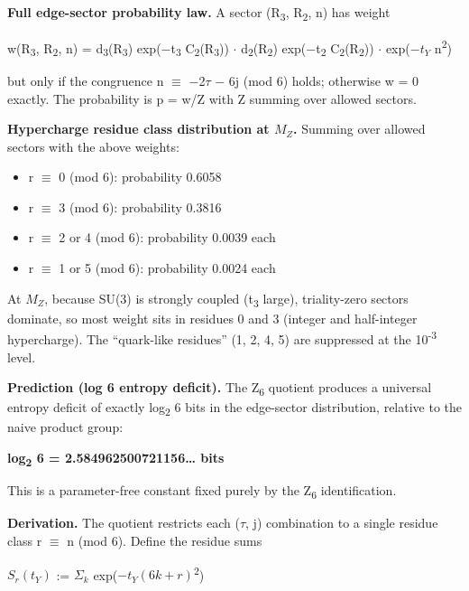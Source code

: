\documentclass[11pt,a4paper]{article}
\theoremstyle{remark}
\providecommand{\tightlist}{%
  \setlength{\itemsep}{0pt}\setlength{\parskip}{0pt}}
\begin{document}
\textbf{Full edge-sector probability law.} A sector (R\textsubscript{3}, R\textsubscript{2}, n) has weight

w(R\textsubscript{3}, R\textsubscript{2}, n) = d\textsubscript{3}(R\textsubscript{3}) exp(\ensuremath{-}t\textsubscript{3} C\textsubscript{2}(R\textsubscript{3})) \ensuremath{\cdot} d\textsubscript{2}(R\textsubscript{2}) exp(\ensuremath{-}t\textsubscript{2} C\textsubscript{2}(R\textsubscript{2})) \ensuremath{\cdot} exp(\ensuremath{-}\(t_Y\) n\textsuperscript{2})

but only if the congruence n \ensuremath{\equiv} \ensuremath{-}2\ensuremath{\tau} \ensuremath{-} 6j (mod 6) holds; otherwise w = 0 exactly. The probability is p = w/Z with Z summing over allowed sectors.

\textbf{Hypercharge residue class distribution at \(M_Z\).} Summing over allowed
sectors with the above weights:

\begin{itemize}
\tightlist
\item
  r \ensuremath{\equiv} 0 (mod 6): probability 0.6058
\item
  r \ensuremath{\equiv} 3 (mod 6): probability 0.3816
\item
  r \ensuremath{\equiv} 2 or 4 (mod 6): probability 0.0039 each
\item
  r \ensuremath{\equiv} 1 or 5 (mod 6): probability 0.0024 each
\end{itemize}

At \(M_Z\), because SU(3) is strongly coupled (t\textsubscript{3} large), triality-zero
sectors dominate, so most weight sits in residues 0 and 3 (integer and
half-integer hypercharge). The ``quark-like residues'' (1, 2, 4, 5) are
suppressed at the 10\textsuperscript{-3} level.

\textbf{Prediction (log 6 entropy deficit).} The Z\textsubscript{6} quotient produces a universal entropy deficit of exactly log\textsubscript{2} 6 bits in the edge-sector distribution, relative to the naive product group:

\textbf{log\textsubscript{2} 6 = 2.584962500721156\ldots{} bits}

This is a parameter-free constant fixed purely by the Z\textsubscript{6} identification.

\textbf{Derivation.} The quotient restricts each (\ensuremath{\tau}, j) combination to a single residue class r \ensuremath{\equiv} n (mod 6). Define the residue sums

\(S_r(t_Y)\) := \(\ensuremath{\Sigma}_k\) exp(\ensuremath{-}\(t_Y(6k+r)\)\textsuperscript{2})
\end{document}
